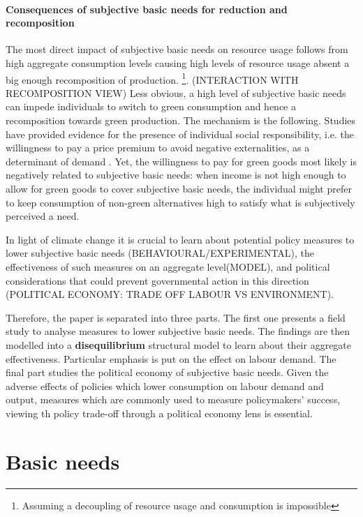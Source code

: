 \documentclass[12pt]{article}
\begin{document}
\paragraph{Consequences of subjective basic needs for reduction and recomposition}
The most direct impact of subjective basic needs on resource usage follows from high aggregate consumption levels causing high levels of resource usage absent a big enough recomposition of production. \footnote{Assuming a decoupling of resource usage and consumption is impossible}. (INTERACTION WITH RECOMPOSITION VIEW) Less obvious, a high level of subjective basic needs can impede individuals to switch to green consumption and hence a recomposition towards green production. The mechanism is the following. Studies have provided evidence for the presence of individual social responsibility, i.e. the willingness to pay a price premium to avoid negative externalities, as a determinant of demand \citep[compare][]{Bartling2015DoResponsibility}. Yet, the willingness to pay for green goods most likely is negatively related to subjective basic needs: when income is not high enough to allow for green goods to cover subjective basic needs, the individual might prefer to keep consumption of non-green alternatives high to satisfy what is subjectively perceived a need. 
  
  
In light of climate change it is crucial to learn about potential policy measures to lower subjective basic needs (BEHAVIOURAL/EXPERIMENTAL), the effectiveness of such measures on an aggregate level(MODEL), and political considerations that could prevent governmental action in this direction (POLITICAL ECONOMY: TRADE OFF LABOUR VS ENVIRONMENT).  

Therefore, the paper is separated into three parts. The first one presents a field study to analyse measures to lower subjective basic needs. The findings are then modelled into a \textbf{disequilibrium} structural model to learn about their aggregate effectiveness. Particular emphasis is put on the effect on labour demand.
The final part studies the political economy of subjective basic needs. Given the adverse effects of policies which lower consumption on labour demand and output, measures which are commonly used to measure policymakers' success, viewing th policy trade-off through a political economy lens is essential. 


\section{Basic needs}
\end{document}
